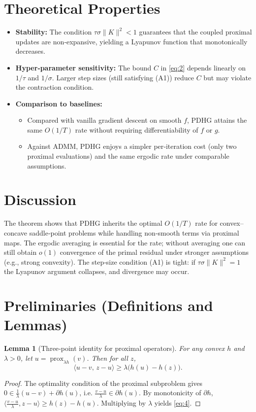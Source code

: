 \documentclass{article}
\newtheorem{lemma}{Lemma}
\newcommand{\prox}{\operatorname{prox}}
\begin{document}
\section*{Theoretical Properties}
\begin{itemize}
  \item \textbf{Stability:} The condition $\tau\sigma\|K\|^{2}<1$ guarantees that the coupled proximal updates are non‑expansive, yielding a Lyapunov function that monotonically decreases.
  \item \textbf{Hyper‑parameter sensitivity:} The bound $C$ in \eqref{eq:2} depends linearly on $1/\tau$ and $1/\sigma$. Larger step sizes (still satisfying (A1)) reduce $C$ but may violate the contraction condition.
  \item \textbf{Comparison to baselines:}
    \begin{itemize}
      \item Compared with vanilla gradient descent on smooth $f$, PDHG attains the same $O(1/T)$ rate without requiring differentiability of $f$ or $g$.
      \item Against ADMM, PDHG enjoys a simpler per‑iteration cost (only two proximal evaluations) and the same ergodic rate under comparable assumptions.
    \end{itemize}
\end{itemize}

\section*{Discussion}
The theorem shows that PDHG inherits the optimal $O(1/T)$ rate for convex–concave saddle‑point problems while handling non‑smooth terms via proximal maps. The ergodic averaging is essential for the rate; without averaging one can still obtain $o(1)$ convergence of the primal residual under stronger assumptions (e.g., strong convexity). The step‑size condition (A1) is tight: if $\tau\sigma\|K\|^{2}=1$ the Lyapunov argument collapses, and divergence may occur.

\section*{Preliminaries (Definitions and Lemmas)}
\begin{lemma}[Three‑point identity for proximal operators]\label{lem:three}
For any convex $h$ and $\lambda>0$, let $u=\prox_{\lambda h}(v)$. Then for all $z$,
\[
\langle u-v,\,z-u\rangle \ge \lambda\bigl( h(u)-h(z)\bigr).
\tag{4}
\]
\end{lemma}
\begin{proof}
The optimality condition of the proximal subproblem gives  
$0\in \frac{1}{\lambda}(u-v)+\partial h(u)$, i.e.
$\frac{v-u}{\lambda}\in\partial h(u)$. By monotonicity of $\partial h$,
$\langle \frac{v-u}{\lambda},z-u\rangle\ge h(z)-h(u)$. Multiplying by $\lambda$ yields \eqref{eq:4}.  \qedhere
\end{proof}
\end{document}
